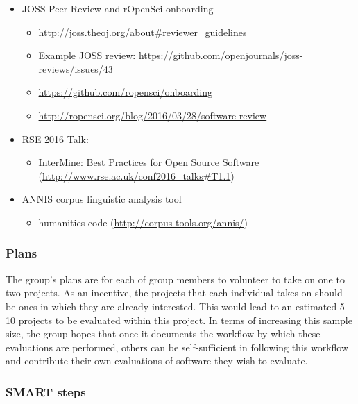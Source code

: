 \begin{itemize}
\item JOSS Peer Review and rOpenSci onboarding
\begin{itemize}
\item \url{http://joss.theoj.org/about#reviewer_guidelines}
\item Example JOSS review: \url{https://github.com/openjournals/joss-reviews/issues/43}
\item \url{https://github.com/ropensci/onboarding}
\item \url{http://ropensci.org/blog/2016/03/28/software-review}
\end{itemize}

\item RSE 2016 Talk:
\begin{itemize}
\item InterMine: Best Practices for Open Source Software (\url{http://www.rse.ac.uk/conf2016_talks#T1.1})
\end{itemize}

\item ANNIS corpus linguistic analysis tool
\begin{itemize}
\item humanities code (\url{http://corpus-tools.org/annis/})
\end{itemize}

\end{itemize}


\subsubsection{Plans}

The group's plans are for each of group members to volunteer to take on one to two projects. As an incentive, the projects that each individual takes on should be ones in which they are already interested.  This would lead to an estimated 5--10 projects to be evaluated within this project.  In terms of increasing this sample size, the group hopes that once it documents the workflow by which these evaluations are performed, others can be self-sufficient in following this workflow and contribute their own evaluations of software they wish to evaluate.

\subsubsection{SMART steps}

